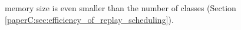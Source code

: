 \begin{itemize}[topsep=1pt,]
    memory size is even smaller than the number of classes (Section \ref{paperC:sec:efficiency_of_replay_scheduling}). 
\end{itemize}





